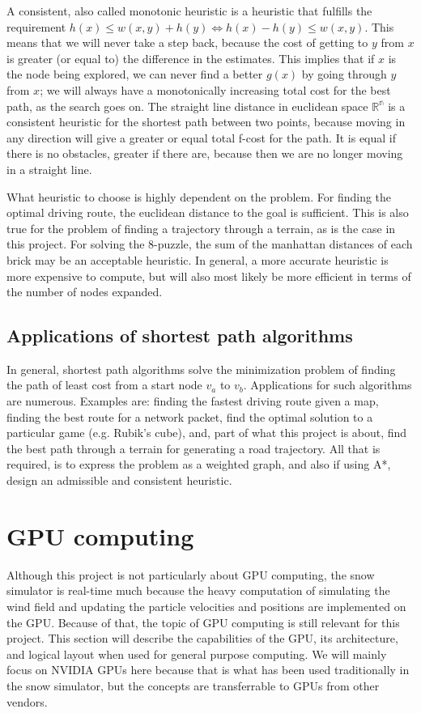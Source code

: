 A consistent, also called monotonic heuristic is a heuristic that fulfills the requirement $h(x) \leq w(x,y) + h(y) \Leftrightarrow h(x)-h(y) \leq w(x,y)$. This means that we will never take a step back, because the cost of getting to $y$ from $x$ is greater (or equal to) the difference in the estimates. This implies that if $x$ is the node being explored, we can never find a better $g(x)$ by going through $y$ from $x$; we will always have a monotonically increasing total cost for the best path, as the search goes on. The straight line distance in euclidean space $\mathbb{R^n}$ is a consistent heuristic for the shortest path between two points, because moving in any direction will give a greater or equal total f-cost for the path. It is equal if there is no obstacles, greater if there are, because then we are no longer moving in a straight line.

What heuristic to choose is highly dependent on the problem. For finding the optimal driving route, the euclidean distance to the goal is sufficient. This is also true for the problem of finding a trajectory through a terrain, as is the case in this project. For solving the 8-puzzle, the sum of the manhattan distances of each brick may be an acceptable heuristic. In general, a more accurate heuristic is more expensive to compute, but will also most likely be more efficient in terms of the number of nodes expanded.

\subsection{Applications of shortest path algorithms}
In general, shortest path algorithms solve the minimization problem of finding the path of least cost from a start node $v_a$ to $v_b$. Applications for such algorithms are numerous. Examples are: finding the fastest driving route given a map, finding the best route for a network packet, find the optimal solution to a particular game (e.g. Rubik's cube), and, part of what this project is about, find the best path through a terrain for generating a road trajectory. All that is required, is to express the problem as a weighted graph, and also if using A*, design an admissible and consistent heuristic. 

\section{GPU computing}
Although this project is not particularly about GPU computing, the snow simulator is real-time much because the heavy computation of simulating the wind field and updating the particle velocities and positions are implemented on the GPU. Because of that, the topic of GPU computing is still relevant for this project. This section will describe the capabilities of the GPU, its architecture, and logical layout when used for general purpose computing. We will mainly focus on NVIDIA GPUs here because that is what has been used traditionally in the snow simulator, but the concepts are transferrable to GPUs from other vendors.

